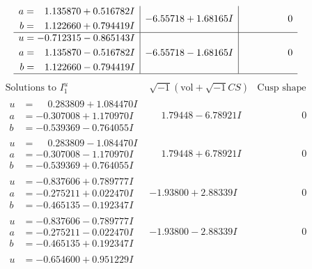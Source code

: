 \documentclass[1p]{elsarticle_modified}
\theoremstyle{definition}
\newcommand{\I}{\sqrt{-1}}
\begin{document}
$$\begin{array}{c|c|c}
\begin{aligned}
a &= \phantom{-}1.135870 + 0.516782 I \\
b &= \phantom{-}1.122660 + 0.794419 I\end{aligned}
 & -6.55718 + 1.68165 I & \phantom{-0.000000 } 0 \\ \hline\begin{aligned}
u &= -0.712315 - 0.865143 I \\
a &= \phantom{-}1.135870 - 0.516782 I \\
b &= \phantom{-}1.122660 - 0.794419 I\end{aligned}
 & -6.55718 - 1.68165 I & \phantom{-0.000000 } 0\\
 \hline 
 \end{array}$$\newpage$$\begin{array}{c|c|c}  
\text{Solutions to }I^u_{1}& \I (\text{vol} + \sqrt{-1}CS) & \text{Cusp shape}\\
 \hline 
\begin{aligned}
u &= \phantom{-}0.283809 + 1.084470 I \\
a &= -0.307008 + 1.170970 I \\
b &= -0.539369 - 0.764055 I\end{aligned}
 & \phantom{-}1.79448 - 6.78921 I & \phantom{-0.000000 } 0 \\ \hline\begin{aligned}
u &= \phantom{-}0.283809 - 1.084470 I \\
a &= -0.307008 - 1.170970 I \\
b &= -0.539369 + 0.764055 I\end{aligned}
 & \phantom{-}1.79448 + 6.78921 I & \phantom{-0.000000 } 0 \\ \hline\begin{aligned}
u &= -0.837606 + 0.789777 I \\
a &= -0.275211 + 0.022470 I \\
b &= -0.465135 - 0.192347 I\end{aligned}
 & -1.93800 + 2.88339 I & \phantom{-0.000000 } 0 \\ \hline\begin{aligned}
u &= -0.837606 - 0.789777 I \\
a &= -0.275211 - 0.022470 I \\
b &= -0.465135 + 0.192347 I\end{aligned}
 & -1.93800 - 2.88339 I & \phantom{-0.000000 } 0 \\ \hline\begin{aligned}
u &= -0.654600 + 0.951229 I \\

\end{aligned}
\end{array}$$
\end{document}
